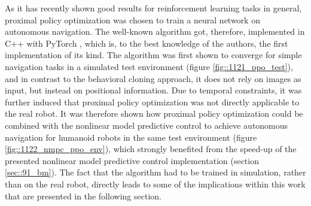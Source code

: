 As it has recently shown good results for reinforcement learning tasks in general, proximal policy optimization \cite{schulman2017proximal} was chosen to train a neural network on autonomous navigation. The well-known algorithm got, therefore, implemented in C++ with PyTorch \cite{paszke2017automatic}, which is, to the best knowledge of the authors, the first implementation of its kind. The algorithm was first shown to converge for simple navigation tasks in a simulated test environment (figure \ref{fig::1121_ppo_test}), and in contrast to the behavioral cloning approach, it does not rely on images as input, but instead on positional information. Due to temporal constraints, it was further induced that proximal policy optimization was not directly applicable to the real robot. It was therefore shown how proximal policy optimization could be combined with the nonlinear model predictive control to achieve autonomous navigation for humanoid robots in the same test environment (figure \ref{fig::1122_nmpc_ppo_env}), which strongly benefited from the speed-up of the presented nonlinear model predictive control implementation (section \ref{sec::91_bm}). The fact that the algorithm had to be trained in simulation, rather than on the real robot, directly leads to some of the implications within this work that are presented in the following section.
\FloatBarrier
